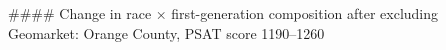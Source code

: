 #### Change in race × first-generation composition after excluding Geomarket: Orange County, PSAT score 1190–1260
